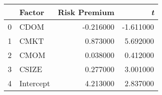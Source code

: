 \begin{tabular}{llrr}
\toprule
 & Factor & Risk Premium & \emph{t} \\
\midrule
0 & CDOM & -0.216000 & -1.611000 \\
1 & CMKT & 0.873000 & 5.692000 \\
2 & CMOM & 0.038000 & 0.412000 \\
3 & CSIZE & 0.277000 & 3.001000 \\
4 & Intercept & 4.213000 & 2.837000 \\
\bottomrule
\end{tabular}
